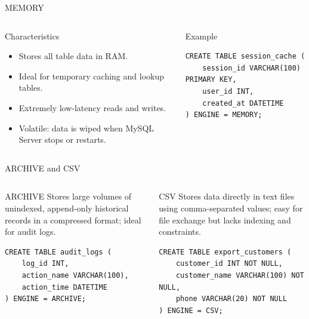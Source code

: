 \documentclass[aspectratio=169,11pt]{beamer}
\newcommand{\smallitem}{\setlength{\itemsep}{2pt}}
\begin{document}
\begin{frame}[fragile]{MEMORY}
\begin{columns}[T,onlytextwidth]
\begin{block}{Characteristics}
\begin{itemize}\smallitem
  \item Stores all table data in RAM.
  \item Ideal for temporary caching and lookup tables.
  \item Extremely low-latency reads and writes.
  \item Volatile: data is wiped when MySQL Server stops or restarts.
\end{itemize}
\end{block}
\begin{block}{Example}
\begin{lstlisting}
CREATE TABLE session_cache (
    session_id VARCHAR(100) PRIMARY KEY,
    user_id INT,
    created_at DATETIME
) ENGINE = MEMORY;
\end{lstlisting}
\end{block}
\end{columns}
\end{frame}

\begin{frame}[fragile]{ARCHIVE and CSV}
\begin{columns}[T,onlytextwidth]
\begin{block}{ARCHIVE}
\small Stores large volumes of unindexed, append-only historical records in a compressed format; ideal for audit logs.
\begin{lstlisting}
CREATE TABLE audit_logs (
    log_id INT,
    action_name VARCHAR(100),
    action_time DATETIME
) ENGINE = ARCHIVE;
\end{lstlisting}
\end{block}
\begin{block}{CSV}
\small Stores data directly in text files using comma-separated values; easy for file exchange but lacks indexing and constraints.
\begin{lstlisting}
CREATE TABLE export_customers (
    customer_id INT NOT NULL,
    customer_name VARCHAR(100) NOT NULL,
    phone VARCHAR(20) NOT NULL
) ENGINE = CSV;
\end{lstlisting}
\end{block}
\end{columns}
\end{frame}
\end{document}
